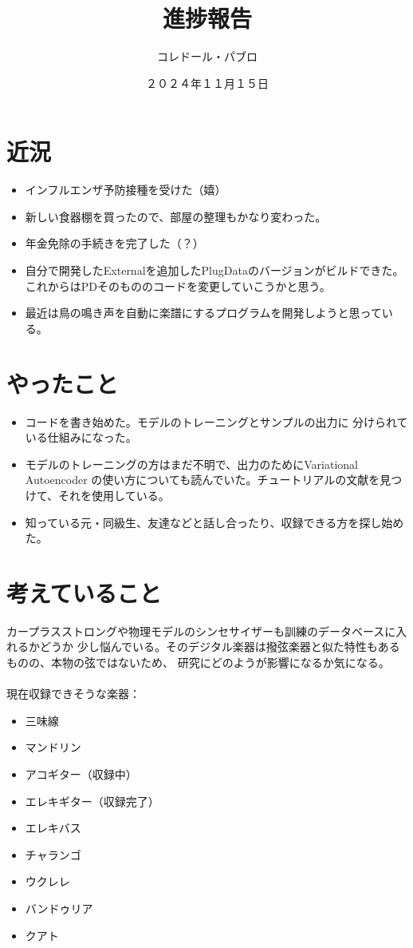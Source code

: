 \documentclass[a4paper, 12pt]{article}
\title{進捗報告}
\author{コレドール・パブロ}
\date{２０２４年１１月１５日}
\begin{document}
\maketitle

\section*{近況}
\begin{itemize}
    \item インフルエンザ予防接種を受けた（嬉）
    \item 新しい食器棚を買ったので、部屋の整理もかなり変わった。
    \item 年金免除の手続きを完了した（？）
    \item 自分で開発したExternalを追加したPlugDataのバージョンがビルドできた。
    これからはPDそのもののコードを変更していこうかと思う。
    \item 最近は鳥の鳴き声を自動に楽譜にするプログラムを開発しようと思っている。
\end{itemize} 

\section*{やったこと}
\begin{itemize}
    \item コードを書き始めた。モデルのトレーニングとサンプルの出力に
    分けられている仕組みになった。
    \item モデルのトレーニングの方はまだ不明で、出力のためにVariational Autoencoder
    の使い方についても読んでいた。チュートリアルの文献を見つけて、それを使用している。\cite{autoencoder_tutorial}
    \item 知っている元・同級生、友達などと話し合ったり、収録できる方を探し始めた。
\end{itemize}

\section*{考えていること}

カープラスストロングや物理モデルのシンセサイザーも訓練のデータベースに入れるかどうか
少し悩んでいる。そのデジタル楽器は撥弦楽器と似た特性もあるものの、本物の弦ではないため、
研究にどのようが影響になるか気になる。\\~\\
現在収録できそうな楽器：
\begin{itemize}
    \item 三味線
    \item マンドリン
    \item アコギター（収録中）
    \item エレキギター（収録完了）
    \item エレキバス
    \item チャランゴ
    \item ウクレレ
    \item バンドゥリア
    \item クアト\\
\end{itemize}
\end{document}
